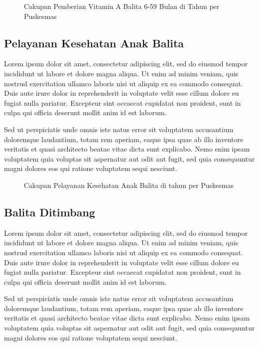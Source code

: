\begin{figure}[H]
    \centering
    \caption{Cakupan Pemberian Vitamin A Balita 6-59 Bulan di \namaKabupaten Tahun \tP per Puskesmas}
    \label{fig:Cakupan-Vitamin-A-Balita}
\end{figure}

\subsection{Pelayanan Kesehatan Anak Balita}
Lorem ipsum dolor sit amet, consectetur adipiscing elit, sed do eiusmod tempor incididunt ut labore et dolore magna aliqua. Ut enim ad minim veniam, quis nostrud exercitation ullamco laboris nisi ut aliquip ex ea commodo consequat. Duis aute irure dolor in reprehenderit in voluptate velit esse cillum dolore eu fugiat nulla pariatur. Excepteur sint occaecat cupidatat non proident, sunt in culpa qui officia deserunt mollit anim id est laborum.

Sed ut perspiciatis unde omnis iste natus error sit voluptatem accusantium doloremque laudantium, totam rem aperiam, eaque ipsa quae ab illo inventore veritatis et quasi architecto beatae vitae dicta sunt explicabo. Nemo enim ipsam voluptatem quia voluptas sit aspernatur aut odit aut fugit, sed quia consequuntur magni dolores eos qui ratione voluptatem sequi nesciunt.

\begin{figure}[H]
    \centering
    \caption{Cakupan Pelayanan Kesehatan Anak Balita di \namaKabupaten tahun \tP per Puskesmas}
    \label{fig:Cakupan-Pelayanan-Kesehatan-Anak-Balita}
\end{figure}

\subsection{Balita Ditimbang}
\label{subsec:Balita-Ditimbang}
Lorem ipsum dolor sit amet, consectetur adipiscing elit, sed do eiusmod tempor incididunt ut labore et dolore magna aliqua. Ut enim ad minim veniam, quis nostrud exercitation ullamco laboris nisi ut aliquip ex ea commodo consequat. Duis aute irure dolor in reprehenderit in voluptate velit esse cillum dolore eu fugiat nulla pariatur. Excepteur sint occaecat cupidatat non proident, sunt in culpa qui officia deserunt mollit anim id est laborum.

Sed ut perspiciatis unde omnis iste natus error sit voluptatem accusantium doloremque laudantium, totam rem aperiam, eaque ipsa quae ab illo inventore veritatis et quasi architecto beatae vitae dicta sunt explicabo. Nemo enim ipsam voluptatem quia voluptas sit aspernatur aut odit aut fugit, sed quia consequuntur magni dolores eos qui ratione voluptatem sequi nesciunt.

